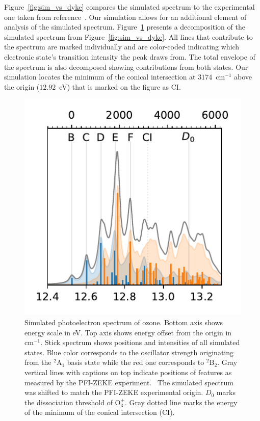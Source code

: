 \documentclass[12pt,a4paper,prb,aps,superscriptaddress]{revtex4}
\begin{document}
Figure~\ref{fig:sim_vs_dyke} compares the simulated spectrum to the
experimental one taken from reference~\cite{dyke:O3:74}. Our simulation allows
for an additional element of analysis of the simulated spectrum.
Figure~\ref{fig:ozone_overlay} presents a decomposition of the simulated
spectrum from Figure~\ref{fig:sim_vs_dyke}. All lines that contribute to the
spectrum are marked individually and are color-coded indicating which
electronic state's transition intensity the peak draws from. The total
envelope of the spectrum is also decomposed showing contributions from both
states. Our simulation locates the minimum of the conical intersection at
$3174$~cm$^{-1}$ above the origin ($12.92$~eV) that is marked on the figure as
CI.

\begin{figure}
    \includegraphics[width=10 cm]{figures/spectrum_overline}
    \caption{
        Simulated photoelectron spectrum of ozone. Bottom axis shows energy
        scale in eV. Top axis shows energy offset from the origin in
        cm$^{-1}$. Stick spectrum shows positions and intensities of all
        simulated states. Blue color corresponds to the oscillator strength
        originating from the $^2$A$_1$ basis state while the red one
        corresponds to $^2$B$_2$. Gray vertical lines with captions on top
        indicate positions of features as measured by the PFI-ZEKE
        experiment.~\cite{Willitsch:O3ZEKE:2005} The simulated spectrum was
        shifted to match the PFI-ZEKE experimental origin. $D_0$ marks the
        dissociation threshold of O$_3^+$. Gray dotted line marks the energy
        of the minimum of the conical intersection (CI).
    }
    \label{fig:ozone_overlay}
\end{figure}
\end{document}
